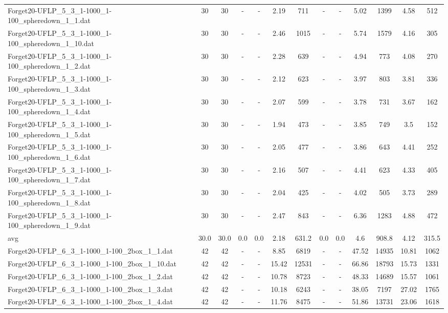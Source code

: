 \begin{table}[!ht]
{\begin{tabular}{lcccccccccccc}
Forget20-UFLP\_5\_3\_1-1000\_1-100\_spheredown\_1\_1.dat & 30 & 30 &  - &  - & 2.19 & 711 &  - &  - & 5.02 & 1399 & 4.58 & 512 \\
Forget20-UFLP\_5\_3\_1-1000\_1-100\_spheredown\_1\_10.dat & 30 & 30 &  - &  - & 2.46 & 1015 &  - &  - & 5.74 & 1579 & 4.16 & 305 \\
Forget20-UFLP\_5\_3\_1-1000\_1-100\_spheredown\_1\_2.dat & 30 & 30 &  - &  - & 2.28 & 639 &  - &  - & 4.94 & 773 & 4.08 & 270 \\
Forget20-UFLP\_5\_3\_1-1000\_1-100\_spheredown\_1\_3.dat & 30 & 30 &  - &  - & 2.12 & 623 &  - &  - & 3.97 & 803 & 3.81 & 336 \\
Forget20-UFLP\_5\_3\_1-1000\_1-100\_spheredown\_1\_4.dat & 30 & 30 &  - &  - & 2.07 & 599 &  - &  - & 3.78 & 731 & 3.67 & 162 \\
Forget20-UFLP\_5\_3\_1-1000\_1-100\_spheredown\_1\_5.dat & 30 & 30 &  - &  - & 1.94 & 473 &  - &  - & 3.85 & 749 & 3.5 & 152 \\
Forget20-UFLP\_5\_3\_1-1000\_1-100\_spheredown\_1\_6.dat & 30 & 30 &  - &  - & 2.05 & 477 &  - &  - & 3.86 & 643 & 4.41 & 252 \\
Forget20-UFLP\_5\_3\_1-1000\_1-100\_spheredown\_1\_7.dat & 30 & 30 &  - &  - & 2.16 & 507 &  - &  - & 4.41 & 623 & 4.33 & 405 \\
Forget20-UFLP\_5\_3\_1-1000\_1-100\_spheredown\_1\_8.dat & 30 & 30 &  - &  - & 2.04 & 425 &  - &  - & 4.02 & 505 & 3.73 & 289 \\
Forget20-UFLP\_5\_3\_1-1000\_1-100\_spheredown\_1\_9.dat & 30 & 30 &  - &  - & 2.47 & 843 &  - &  - & 6.36 & 1283 & 4.88 & 472 \\
\hline avg & 30.0 & 30.0 & 0.0& 0.0 & 2.18& 631.2 & 0.0& 0.0 & 4.6& 908.8 & 4.12& 315.5\\ \hline
Forget20-UFLP\_6\_3\_1-1000\_1-100\_2box\_1\_1.dat & 42 & 42 &  - &  - & 8.85 & 6819 &  - &  - & 47.52 & 14935 & 10.81 & 1062 \\
Forget20-UFLP\_6\_3\_1-1000\_1-100\_2box\_1\_10.dat & 42 & 42 &  - &  - & 15.42 & 12531 &  - &  - & 66.86 & 18793 & 15.73 & 1331 \\
Forget20-UFLP\_6\_3\_1-1000\_1-100\_2box\_1\_2.dat & 42 & 42 &  - &  - & 10.78 & 8723 &  - &  - & 48.33 & 14689 & 15.57 & 1061 \\
Forget20-UFLP\_6\_3\_1-1000\_1-100\_2box\_1\_3.dat & 42 & 42 &  - &  - & 10.18 & 6243 &  - &  - & 38.05 & 7197 & 27.02 & 1765 \\
Forget20-UFLP\_6\_3\_1-1000\_1-100\_2box\_1\_4.dat & 42 & 42 &  - &  - & 11.76 & 8475 &  - &  - & 51.86 & 13731 & 23.06 & 1618 \\

\end{tabular}}
\end{table}
